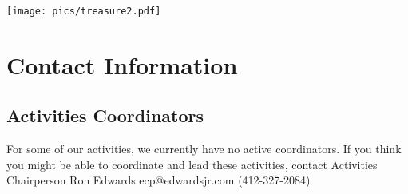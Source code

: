 \documentclass[10pt,a4paper]{article}
\newenvironment{Figure}
  {\par\medskip\noindent\minipage{\linewidth}}
  {\endminipage\par\medskip}
\begin{document}
\begin{Figure}
 \centering
 \texttt{[image: pics/treasure2.pdf]}
\end{Figure}

\pagebreak


\pagebreak
\clearpage



\appendix

\section{Contact Information}

\subsection{Activities Coordinators}
For some of our activities, we currently have no active coordinators. If you think you might be able to coordinate
and lead these activities, contact Activities Chairperson Ron Edwards ecp@edwardsjr.com (412-327-2084)
\end{document}
